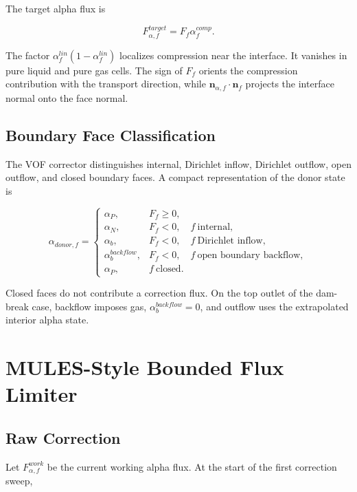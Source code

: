 \documentclass[11pt]{article}
\begin{document}
The target alpha flux is

\begin{equation}
  F_{\alpha,f}^{target}
  =
  F_f\alpha_f^{comp}.
  \label{eq:target-alpha-flux}
\end{equation}

The factor \(\alpha_f^{lin}(1-\alpha_f^{lin})\) localizes compression near the
interface.  It vanishes in pure liquid and pure gas cells.  The sign of \(F_f\)
orients the compression contribution with the transport direction, while
\(\mathbf{n}_{\alpha,f}\cdot\mathbf{n}_f\) projects the interface normal onto
the face normal.

\subsection{Boundary Face Classification}

The VOF corrector distinguishes internal, Dirichlet inflow, Dirichlet outflow,
open outflow, and closed boundary faces.  A compact representation of the donor
state is

\begin{equation}
  \alpha_{donor,f}
  =
  \begin{cases}
    \alpha_P,
      & F_f\ge 0,\\
    \alpha_N,
      & F_f<0,\quad f\ \text{internal},\\
    \alpha_b,
      & F_f<0,\quad f\ \text{Dirichlet inflow},\\
    \alpha_b^{backflow},
      & F_f<0,\quad f\ \text{open boundary backflow},\\
    \alpha_P,
      & f\ \text{closed}.
  \end{cases}
\end{equation}

Closed faces do not contribute a correction flux.  On the top outlet of the
dam-break case, backflow imposes gas, \(\alpha_b^{backflow}=0\), and outflow
uses the extrapolated interior alpha state.

\section{MULES-Style Bounded Flux Limiter}

\subsection{Raw Correction}

Let \(F_{\alpha,f}^{work}\) be the current working alpha flux.  At the start of
the first correction sweep,
\end{document}
